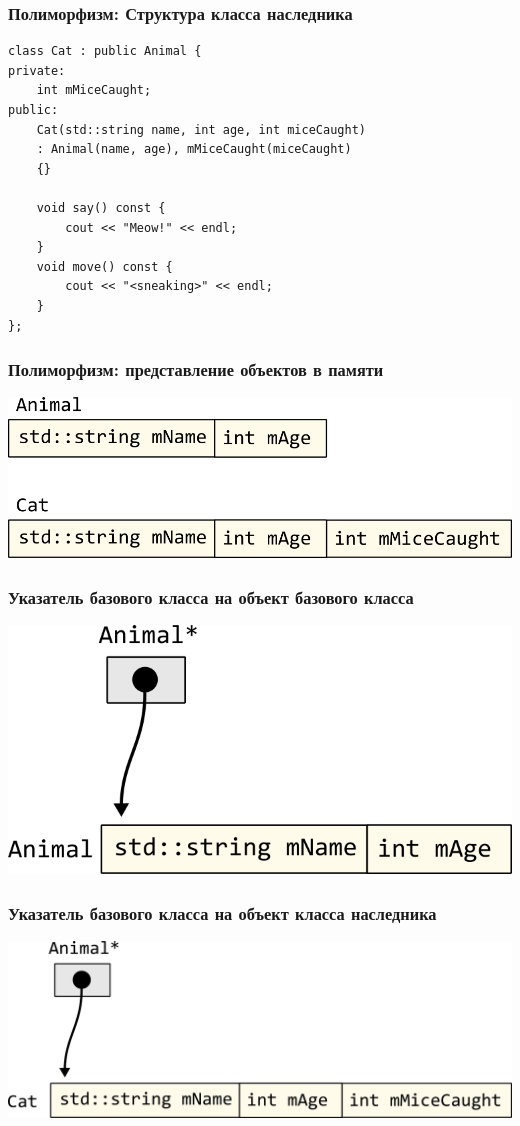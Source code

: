 \documentclass[10pt,pdf,hyperref={unicode}]{beamer}
\begin{document}
\begin{frame}[fragile]
\frametitle{Полиморфизм: Структура класса наследника}
\begin{lstlisting}
class Cat : public Animal {
private:
    int mMiceCaught;
public:
    Cat(std::string name, int age, int miceCaught) 
    : Animal(name, age), mMiceCaught(miceCaught) 
    {}

    void say() const {
        cout << "Meow!" << endl;
    }
    void move() const {
        cout << "<sneaking>" << endl;
    }
};
\end{lstlisting}
\end{frame}


\begin{frame}[fragile]
\frametitle{Полиморфизм: представление объектов в памяти}
\begin{center}
\includegraphics[width=\imageSizeMult\linewidth]{../images/classes_representation.png}
\end{center}
\end{frame}


\begin{frame}[fragile]
\frametitle{Указатель базового класса на объект базового класса}
\begin{center}
\includegraphics[width=0.7\linewidth]{../images/animal_pointer_to_animal.png}
\end{center}
\end{frame}

\begin{frame}[fragile]
\frametitle{Указатель базового класса на объект класса наследника}
\begin{center}
\includegraphics[width=\imageSizeMult\linewidth]{../images/animal_pointer_to_cat.png}
\end{center}
\end{frame}
\end{document}
